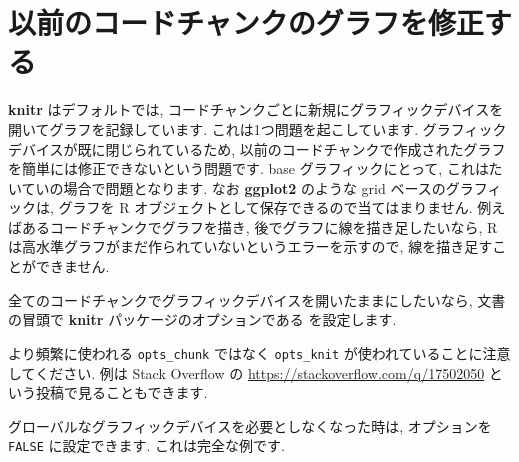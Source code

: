\documentclass[
  11pt,
]{bxjsreport}
\newenvironment{Shaded}{\begin{snugshade}}{\end{snugshade}}
\newcommand{\AttributeTok}[1]{\textcolor[rgb]{0.77,0.63,0.00}{#1}}
\newcommand{\ConstantTok}[1]{\textcolor[rgb]{0.00,0.00,0.00}{#1}}
\newcommand{\FunctionTok}[1]{\textcolor[rgb]{0.00,0.00,0.00}{#1}}
\newcommand{\NormalTok}[1]{#1}
\newcommand{\SpecialCharTok}[1]{\textcolor[rgb]{0.00,0.00,0.00}{#1}}
\begin{document}
\hypertarget{global-device}{%
\section{以前のコードチャンクのグラフを修正する}\label{global-device}}

\textbf{knitr} はデフォルトでは, コードチャンクごとに新規にグラフィックデバイスを開いてグラフを記録しています. これは1つ問題を起こしています. グラフィックデバイスが既に閉じられているため, 以前のコードチャンクで作成されたグラフを簡単には修正できないという問題です. base グラフィックにとって, これはたいていの場合で問題となります. なお \textbf{ggplot2} \autocite{R-ggplot2} のような grid ベースのグラフィックは, グラフを R オブジェクトとして保存できるので当てはまりません. 例えばあるコードチャンクでグラフを描き, 後でグラフに線を描き足したいなら, R は高水準グラフがまだ作られていないというエラーを示すので, 線を描き足すことができません.

全てのコードチャンクでグラフィックデバイスを開いたままにしたいなら, 文書の冒頭で \textbf{knitr} パッケージのオプションである  を設定します.

\begin{Shaded}
\end{Shaded}

より頻繁に使われる \texttt{opts\_chunk} ではなく \texttt{opts\_knit} が使われていることに注意してください. 例は Stack Overflow の \url{https://stackoverflow.com/q/17502050} という投稿で見ることもできます.

グローバルなグラフィックデバイスを必要としなくなった時は, オプションを \texttt{FALSE} に設定できます. これは完全な例です.
\end{document}
